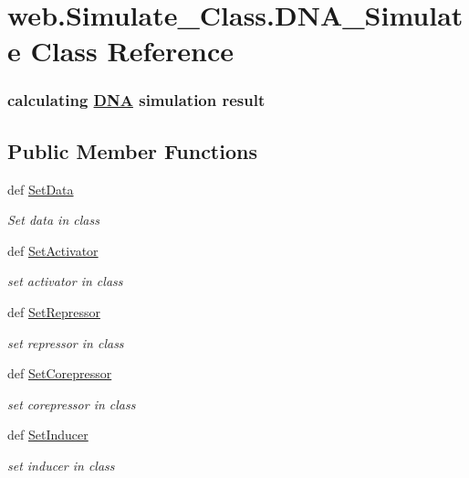 \hypertarget{classweb_1_1_simulate___class_1_1_d_n_a___simulate}{\section{web.\-Simulate\-\_\-\-Class.\-D\-N\-A\-\_\-\-Simulate Class Reference}
\label{classweb_1_1_simulate___class_1_1_d_n_a___simulate}
}


\subsubsection*{calculating \hyperlink{class_d_n_a}{D\-N\-A} simulation result } 


\subsection*{Public Member Functions}
\begin{DoxyCompactItemize}
\item 
def \hyperlink{classweb_1_1_simulate___class_1_1_d_n_a___simulate_a06ff5bd8c89a820405d937a5f8a837f3}{Set\-Data}
\begin{DoxyCompactList}\small\item\em Set data in class \end{DoxyCompactList}\item 
def \hyperlink{classweb_1_1_simulate___class_1_1_d_n_a___simulate_ad17aed6fe820df86a76eae9e307c6fbc}{Set\-Activator}
\begin{DoxyCompactList}\small\item\em set activator in class \end{DoxyCompactList}\item 
def \hyperlink{classweb_1_1_simulate___class_1_1_d_n_a___simulate_af3ad470a356961ff4019e740f813e321}{Set\-Repressor}
\begin{DoxyCompactList}\small\item\em set repressor in class \end{DoxyCompactList}\item 
def \hyperlink{classweb_1_1_simulate___class_1_1_d_n_a___simulate_a467aabf0e04b68c0b813931ffdfbd86c}{Set\-Corepressor}
\begin{DoxyCompactList}\small\item\em set corepressor in class \end{DoxyCompactList}\item 
def \hyperlink{classweb_1_1_simulate___class_1_1_d_n_a___simulate_ad7ed3917ea1662b7d8ebded6ae6c9275}{Set\-Inducer}
\begin{DoxyCompactList}\small\item\em set inducer in class \end{DoxyCompactList}\end{DoxyCompactItemize}
